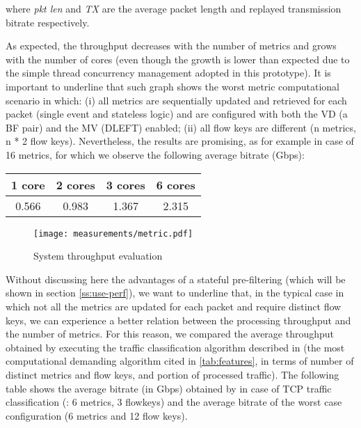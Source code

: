 \documentclass[conference,letterpaper]{sig-alternate-10pt}
\begin{document}
where \textit{pkt len} and \textit{TX} are the average packet length and replayed transmission bitrate respectively. 

As expected, the throughput decreases with the number of metrics and grows with the number of cores (even though the growth is lower than expected due to the simple thread concurrency management adopted in this prototype). It is important to underline that such graph shows the worst metric computational scenario in which: (i) all metrics are sequentially updated and retrieved for each packet (single event and stateless logic) and are configured with both the VD (a BF pair) and the MV (DLEFT) enabled; (ii) all flow keys are different (n metrics, n * 2 flow keys). Nevertheless, the results are promising, as for example in case of 16 metrics, for which we observe the following average bitrate (Gbps):

\begin{center}
\begin{footnotesize}
\begin{tabular}{ | c | c | c | c |}
\hline
\textbf{1 core} & \textbf{2 cores} & \textbf{3 cores} & \textbf{6 cores}\\
\hline
0.566 & 0.983 & 1.367 & 2.315 \\
\hline
\end{tabular}
\end{footnotesize}
\end{center}

\begin{figure}[!t]
\centering
\texttt{[image: measurements/metric.pdf]}
\caption{System throughput evaluation}
\label{fig:metric-measurement}
\end{figure}

Without discussing here the advantages of a stateful pre-filtering (which will be shown in section \ref{ss:use-perf}), we want to underline that, in the typical case in which not all the metrics are updated for each packet and require distinct flow keys, we can experience a better relation between the processing throughput and the number of metrics. For this reason, we compared the average throughput obtained by executing the traffic classification algorithm described in \cite{complex} (the most computational demanding algorithm cited in \ref{tab:features}, in terms of number of distinct metrics and flow keys, and portion of processed traffic). The following table shows the average bitrate (in Gbps) obtained by \cite{complex} in case of TCP traffic classification (\cite{complex}: 6 metrics, 3 flowkeys) and the average bitrate of the worst case configuration (6 metrics and 12 flow keys). 
\end{document}
